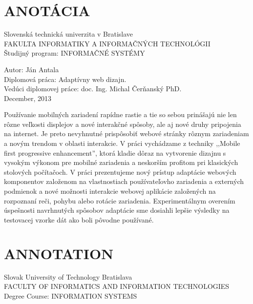 
\newpage


%



\section*{ANOTÁCIA}
\thispagestyle{empty}
Slovenská technická univerzita v Bratislave\\
FAKULTA INFORMATIKY A INFORMAČNÝCH TECHNOLÓGII\\
Študijný program: INFORMAČNÉ SYSTÉMY
\newline

Autor: Ján Antala\\
Diplomová práca: Adaptívny web dizajn.\\ 
Vedúci diplomovej práce: doc. Ing. Michal Čerňanský PhD. \\
December, 2013
\newline

Používanie mobilných zariadení rapídne rastie a tie so sebou prinášajú nie len rôzne veľkosti displejov a nové interakčné spôsoby, ale aj nové druhy pripojenia na internet. Je preto nevyhnutné prispôsobiť webové stránky rôznym zariadeniam a novým trendom v oblasti interakcie.
V práci vychádzame z techniky ,,Mobile first progressive enhancement'', ktorá kladie dôraz na vytvorenie dizajnu s vysokým výkonom pre mobilné zariadenia a neskorším profitom pri klasických stolových počítačoch. V práci prezentujeme nový prístup adaptácie webových komponentov založenom na vlastnostiach používateľovho zariadenia a externých podmienok a nové možnosti interakcie webovej aplikácie založených na rozpoznaní reči, pohybu alebo rotácie zariadenia.
Experimentálnym overením úspešnosti navrhnutých spôsobov adaptácie sme dosiahli lepšie výsledky na testovacej vzorke dát ako boli pôvodne používané.

\newpage

\section*{ANNOTATION}
\thispagestyle{empty}
Slovak University of Technology Bratislava\\
FACULTY OF INFORMATICS AND INFORMATION TECHNOLOGIES\\
Degree Course: INFORMATION SYSTEMS
\newline

